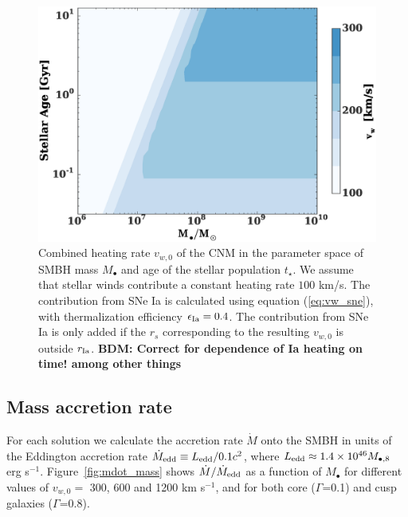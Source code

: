 \documentclass[usenatbib,fleqn]{mn2e}
\newcommand{\Mbh}[1][]{M_{\bullet#1}}
\newcommand{\rIa}{r_{\rm Ia}}
\newcommand{\vwO}{v_{w,0}}
\begin{document}
  \begin{figure}
    \includegraphics[width=\columnwidth]{vw-contour.eps}
    \caption{\label{fig:vweff} Combined heating rate $\vwO$ of the CNM
      in the parameter space of SMBH mass $\Mbh$ and age of the
      stellar population $t_{\star}$.  We assume that stellar winds
      contribute a constant heating rate $100$ km/s. The contribution
      from SNe Ia is calculated using equation (\ref{eq:vw_sne}), with
      thermalization efficiency $\epsilon_{\rm Ia}=0.4$. The
      contribution from SNe Ia is only added if the $r_s$
      corresponding to the resulting $\vwO$ is outside
      $\rIa$.  {\bf BDM: Correct for dependence of Ia heating on time!
      among  other things}}%
  \end{figure}


\subsection{Mass accretion rate}

For each solution we calculate the accretion rate $\dot{M}$ onto the
SMBH in units of the Eddington accretion rate $\dot{M}_{\rm edd}
\equiv L_{\rm edd}/0.1 c^{2}$, where $L_{\rm edd} \approx 1.4\times
10^{46}M_{\bullet,8}$ erg s$^{-1}$.  Figure~\ref{fig:mdot_mass} shows
$\dot{M}/\dot{M}_{\rm edd}$ as a function of $\Mbh$ for different
values of $\vwO =$ 300, 600 and 1200 km s$^{-1}$, and for
both core ($\Gamma$=0.1) and cusp galaxies ($\Gamma$=0.8).
\end{document}
